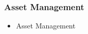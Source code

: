 \begin{frame}

\frametitle{Asset Management}


\begin{itemize}
\item Asset Management



\end{itemize}

\end{frame}